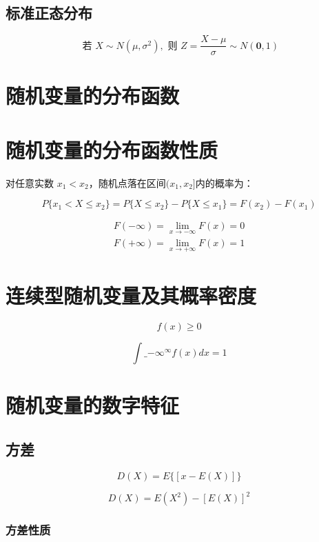 \subsection{标准正态分布}

$$
\text { 若 } X \sim N\left(\mu, \sigma^{2}\right), \text { 则 } Z=\frac{X-\mu}{\sigma} \sim N(\mathbf{0}, 1)
$$

\section{随机变量的分布函数}

\section{随机变量的分布函数性质}

对任意实数 $x_1<x_2$，随机点落在区间$( x_1 ,  x_2 ]$内的概率为：

$$
P\{ x_1<X  \le  x_2\} =P\{ X  \le   x_2 \} - P\{ X  \le   x_1 \}= F(x_2)-F(x_1)
$$

$$
\begin{array}{l}
F(-\infty)=\lim_{x \rightarrow-\infty} F(x)=0 \\
F(+\infty)=\lim_{x \rightarrow+\infty} F(x)=1
\end{array}
$$

\section{连续型随机变量及其概率密度}

$$ f(x) \geq 0 $$

$$ \int\_{-\infty}^{\infty} f(x) d x=1 $$


\section{随机变量的数字特征}

\subsection{方差}


$$
 D(X) = E \Big\{ [x-E(X)] \Big\}
$$

$$
 D(X) = E(X^2) - [E(X)] ^2
$$

\subsubsection{方差性质}

